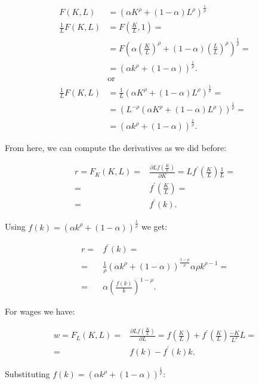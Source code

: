 \documentclass[11pt,a4paper,english]{article}
\begin{document}
\begin{align*}
    F(K,L) &= (\alpha K^\rho + (1-\alpha)L^\rho)^\frac{1}{\rho} \\
    \frac{1}{L} F(K,L) &= F\left(\frac{K}{L},1\right) =\\
    &= F\left( \alpha \left(\frac{K}{L}\right)^\rho + (1-\alpha) \left(\frac{L}{L}\right)^\rho\right)^\frac{1}{\rho} = \\
    &= \left(\alpha k^\rho + (1-\alpha)\right)^\frac{1}{\rho}.\\
    &\mathrm{or} \\
    \frac{1}{L} F(K,L) &= \frac{1}{L} \left(\alpha K^\rho + (1-\alpha)L^\rho\right)^\frac{1}{\rho} = \\
    &= \left(L^{-\rho}\left(\alpha K^\rho + (1-\alpha)L^\rho\right)\right)^\frac{1}{\rho} = \\
    &= \left(\alpha k^\rho + (1-\alpha)\right)^\frac{1}{\rho}.
\end{align*}

From here, we can compute the derivatives as we did before:

\begin{align*}
    r = F_K (K,L) =& \frac{\partial  L f\left( \frac{K}{L} \right)}{\partial K} = L f^\prime\left(\frac{K}{L}\right) \frac{1}{L} = \\
    =& f^\prime\left(\frac{K}{L}\right) = \\
    =& f^\prime(k).
\end{align*}

Using $ f(k) = \left( \alpha k^\rho + (1-\alpha)\right)^\frac{1}{\rho}$ we get:

\begin{align*}
    r =& f^\prime(k) = \\
=& \frac{1}{\rho}\left(\alpha k^\rho + (1-\alpha)\right)^\frac{1-\rho}{\rho}\alpha \rho  k^{\rho-1} = \\
=& \alpha \left(\frac{f(k)}{k}\right)^{1-\rho}.
\end{align*}

For wages we have:

\begin{align*}
    w = F_L(K,L) =& \frac{\partial L f\left( \frac{K}{L} \right)}{\partial L} = f\left(\frac{K}{L}\right) + f^\prime\left(\frac{K}{L}\right)\frac{-K}{L^2}L  = \\
    =& f(k) - f^\prime(k) k.
\end{align*}

Substituting $f(k) = \left(\alpha k^\rho + (1-\alpha)\right)^\frac{1}{\rho}$:
\end{document}
